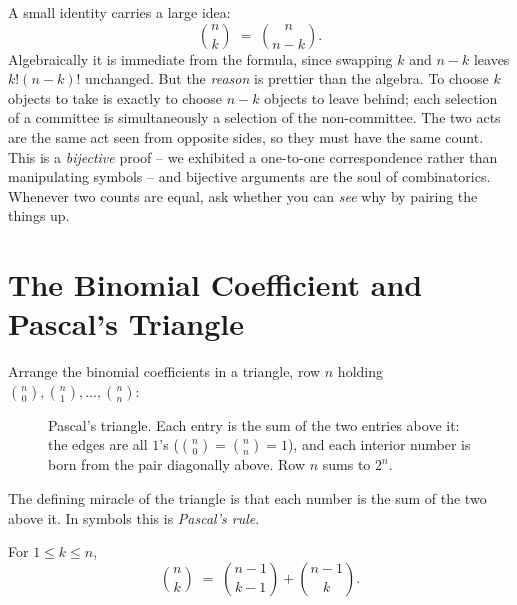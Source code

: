 A small identity carries a large idea:
\[
  \binom{n}{k} \;=\; \binom{n}{n-k}.
\]
Algebraically it is immediate from the formula, since swapping $k$ and $n-k$ leaves
$k!(n-k)!$ unchanged. But the \emph{reason} is prettier than the algebra. To choose $k$
objects to take is exactly to choose $n-k$ objects to leave behind; each selection of a
committee is simultaneously a selection of the non-committee. The two acts are the same act
seen from opposite sides, so they must have the same count. This is a \emph{bijective}
proof -- we exhibited a one-to-one correspondence rather than manipulating symbols -- and
bijective arguments are the soul of combinatorics. Whenever two counts are equal, ask
whether you can \emph{see} why by pairing the things up.

\section{The Binomial Coefficient and Pascal's Triangle}
\label{ch2:pascal}

Arrange the binomial coefficients in a triangle, row $n$ holding $\binom{n}{0}, \binom{n}{1},
\dots, \binom{n}{n}$:

\begin{figure}[H]
\centering
{}
\caption{Pascal's triangle. Each entry is the sum of the two entries above it: the edges
are all $1$'s ($\binom{n}{0}=\binom{n}{n}=1$), and each interior number is born from the
pair diagonally above. Row $n$ sums to $2^n$.}
\label{ch2:fig-pascal}
\end{figure}

The defining miracle of the triangle is that each number is the sum of the two above it.
In symbols this is \emph{Pascal's rule}.

\begin{theorem}
\label{ch2:thm-pascal}
For $1 \le k \le n$,
\[
  \binom{n}{k} \;=\; \binom{n-1}{k-1} + \binom{n-1}{k}.
\]
\end{theorem}

